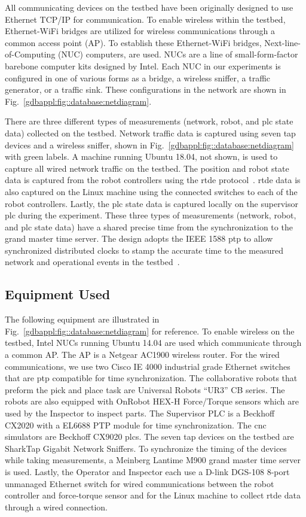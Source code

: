 All communicating devices on the testbed have been originally designed to use Ethernet TCP/IP for communication. To enable wireless within the testbed, Ethernet-WiFi bridges are utilized for wireless communications through a common access point (AP). To establish these Ethernet-WiFi bridges, Next-line-of-Computing (NUC) computers, are used.  NUCs are a line of small-form-factor barebone computer kits designed by Intel.   Each NUC in our experiments is configured in one of various forms as a bridge, a wireless sniffer, a traffic generator, or a traffic sink. These configurations in the network are shown in Fig.~\ref{gdbappl:fig::database:netdiagram}.

There are three different types of measurements (network, robot, and \gls{plc} state data) collected on the testbed. Network traffic data is captured using seven \gls{tap} devices and a wireless sniffer, shown in Fig.~\ref{gdbappl:fig::database:netdiagram} with green labels. A machine running Ubuntu 18.04, not shown, is used to capture all wired network traffic on the testbed. The position and robot state data is captured from the robot controllers using the \gls{rtde} protocol~\cite{RTDE}. \Gls{rtde} data is also captured on the Linux machine using the connected switches to each of the robot controllers. Lastly, the \gls{plc} state data is captured locally on the supervisor \gls{plc} during the experiment. These three types of measurements (network, robot, and \gls{plc} state data) have a shared precise time from the synchronization to the grand master time server. The design adopts the IEEE 1588 \gls{ptp} to allow synchronized distributed clocks to stamp the accurate time to the measured network and operational events in the testbed~\cite{IEEE-Std-1588-2008-redline}.

\subsection{Equipment Used}

The following equipment are illustrated in Fig.~\ref{gdbappl:fig::database:netdiagram} for reference.
To enable wireless on the testbed, Intel NUCs running Ubuntu 14.04 are used which communicate through a common AP. The AP is a Netgear AC1900 wireless router. For the wired communications, we use two Cisco IE 4000 industrial grade Ethernet switches that are \gls{ptp} compatible for time synchronization. The collaborative robots that preform the pick and place task are Universal Robots “UR3” CB series. The robots are also equipped with OnRobot HEX-H Force/Torque sensors which are used by the Inspector to inspect parts. The Supervisor PLC is a Beckhoff CX2020 with a EL6688 PTP module for time synchronization. The \gls{cnc} simulators are Beckhoff CX9020 \glspl{plc}. The seven \gls{tap} devices on the testbed are SharkTap Gigabit Network Sniffers. To synchronize the timing of the devices while taking measurements, a Meinberg Lantime M900 grand master time server is used. Lastly, the Operator and Inspector each use a D-link DGS-108 8-port unmanaged Ethernet switch for wired communications between the robot controller and force-torque sensor and for the Linux machine to collect \gls{rtde} data through a wired connection.

